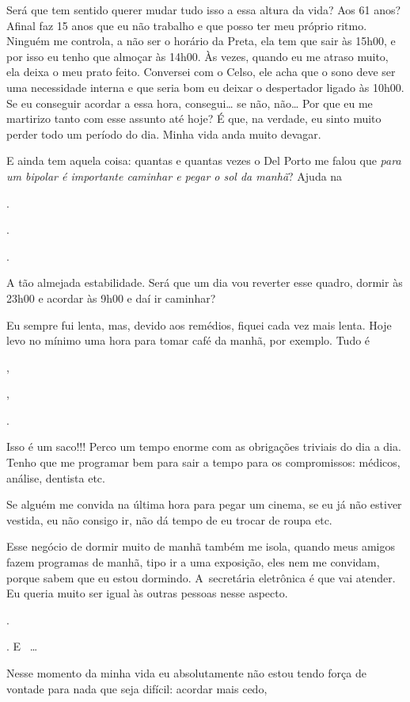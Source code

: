 Será que tem sentido querer mudar tudo isso a essa altura da vida? Aos
61 anos? Afinal faz 15 anos que eu não trabalho e que posso ter meu
próprio ritmo. Ninguém me controla, a não ser o horário da Preta, ela
tem que sair às 15h00, e por isso eu tenho que almoçar às 14h00. Às
vezes, quando eu me atraso muito, ela deixa o meu prato feito. Conversei
com o Celso, ele acha que o sono deve ser uma necessidade interna e que
seria bom eu deixar o despertador ligado às 10h00. Se eu conseguir
acordar a essa hora, consegui… se não, não… Por que eu me
martirizo tanto com esse assunto até hoje? É que, na verdade, eu sinto
muito perder todo um período do dia. Minha vida anda muito devagar.

E ainda tem aquela coisa: quantas e quantas vezes o Del Porto me falou
que \emph{para um bipolar é importante caminhar e pegar o sol da manhã}?
Ajuda na

.

.

.

A tão almejada estabilidade. Será que um dia vou reverter esse quadro,
dormir às 23h00 e acordar às 9h00 e daí ir caminhar?

Eu sempre fui lenta, mas, devido aos remédios, fiquei cada vez mais
lenta. Hoje levo no mínimo uma hora para tomar café da manhã, por
exemplo. Tudo é

,

,

.

Isso é um saco!!! Perco um tempo enorme com as obrigações triviais do
dia a dia. Tenho que me programar bem para sair a tempo para os
compromissos: médicos, análise, dentista etc.

Se alguém me convida na última hora para pegar um cinema, se eu já não
estiver vestida, eu não consigo ir, não dá tempo de eu trocar de roupa
etc.

Esse negócio de dormir muito de manhã também me isola, quando meus
amigos fazem programas de manhã, tipo ir a uma exposição, eles nem me
convidam, porque sabem que eu estou dormindo. A~secretária eletrônica é
que vai atender. Eu queria muito ser igual às outras pessoas nesse
aspecto.

.

. E~   …

Nesse momento da minha vida eu absolutamente não estou tendo força de
vontade para nada que seja difícil: acordar mais cedo,


